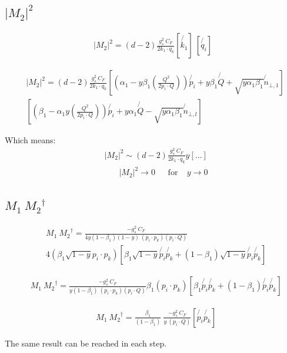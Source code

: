 \subsection*{$ |M_2|^2 $}

\begin{equation}
\begin{split}
|M_2|^2 =(d-2) \frac{g_s^2 \: C_F }{2k_1 \cdot q_k} [\not{k_1}]\: 
[\not{q_i} ]
\end{split}
\end{equation}

\begin{equation}
\begin{split}
&|M_2|^2 =(d-2) \frac{g_s^2 \: C_F}{2k_1 \cdot q_k} [(\alpha_1 -y\beta_1(\frac{Q^2}{2p_i \cdot Q})) \not{p_i} + y\beta_1\not{Q} + \sqrt{y\alpha_1\beta_1}\not{n}_{\bot,1}]\: \\
&[(\beta_1 -\alpha_1 y(\frac{Q^2}{2p_i \cdot Q}))\not{p_i} + y\alpha_1\not{Q} - \sqrt{y\alpha_1\beta_1}\not{n}_{\bot,l} ]
\end{split}
\end{equation}

Which means:
\begin{equation}
\begin{split}
&|M_2|^2 \sim(d-2) \frac{g_s^2 \: C_F}{2k_1 \cdot q_k} y[...]\\
&\:\:\:\:\:\:\:\:|M_2|^2\rightarrow 0 \:\:\:\:\:\:\:\text{for}\:\:\:\:\: y\rightarrow 0
\end{split}
\end{equation}

\subsection*{$ M_1\: {M_2}^{\dagger} $}


\begin{equation}
\begin{split}
&M_1\: {M_2}^{\dagger} = \frac{-g_s^2\: C_F }{4y(1-\beta_1) (1-y)\:(p_i \cdot p_k)(p_i \cdot Q)} \\
&4(\beta_1 \sqrt{1-y}{p_i}\cdot {{p_k}})[\beta_1 \sqrt{1-y}\not{p_i} \not{p_k}+ (1-\beta_1) \sqrt{1-y}\not{p_i}\not{p_k}]
\end{split}
\end{equation}

\begin{equation}
\begin{split}
&M_1\: {M_2}^{\dagger} = \frac{-g_s^2\: C_F }{y(1-\beta_1) \:(p_i \cdot p_k)(p_i \cdot Q)} \beta_1( {p_i}\cdot {{p_k}})[\beta_1 \not{p_i} \not{p_k}+ (1-\beta_1) \not{p_i}\not{p_k}]
\end{split}
\end{equation}

\begin{equation}
\begin{split}
&M_1\: {M_2}^{\dagger} = \frac{\beta_1}{(1-\beta_1)}\: \frac{-g_s^2\: C_F }{y \:(p_i \cdot Q)} [\not{p_i} \not{p_k}]
\end{split}
\end{equation}

The same result can be reached in each step.
\newpage
